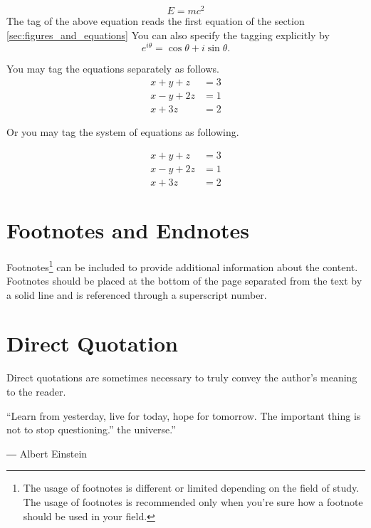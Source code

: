 \documentclass[11pt]{report}
\numberwithin{figure}{section}
\theoremstyle{plain}
\theoremstyle{definition}
\theoremstyle{corollary}
\theoremstyle{definition}
\theoremstyle{plain}
\theoremstyle{definition}
\theoremstyle{plain}
\begin{document}
\begin{equation}
E=mc^2
\end{equation}
The tag of the above equation reads the first equation of the section \ref{sec:figures_and_equations}
You can also specify the tagging explicitly by
\begin{equation}
e^{i\theta}=\cos\theta+i\sin\theta.
\end{equation}

You may tag the equations separately as follows.
\begin{align}
x+y+z&=3\\
x-y+2z&=1\\
x+3z&=2
\end{align}

Or you may tag the system of equations as following.

\begin{equation}
\begin{aligned}
x+y+z&=3\\
x-y+2z&=1\\
x+3z&=2
\end{aligned}
\end{equation}

\section{Footnotes and Endnotes}\label{sec:footnotes_endnotes}

Footnotes\footnote{The usage of footnotes is different or limited depending on the field of study. The usage of footnotes is recommended only when you’re sure how a footnote should be used in your field.} can be included to provide additional information about the content. Footnotes should be placed at the bottom of the page separated from the text by a solid line and is referenced through a superscript number.

\section{Direct Quotation}\label{sec:quotation}
Direct quotations are sometimes necessary to truly convey the author's meaning to the reader. \par
\bigskip

\leftskip 1.5cm
\rightskip 1.5cm 

“Learn from yesterday, live for today, hope for tomorrow. The important thing is not to stop questioning.” the universe.” \par
― Albert Einstein 
\end{document}
